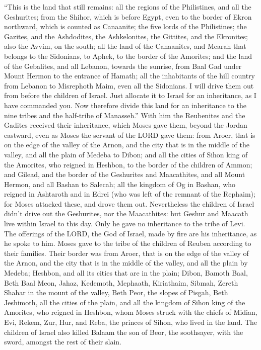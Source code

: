  ``This is the land that still remains: all the regions of
the Philistines, and all the Geshurites;  from the Shihor,
which is before Egypt, even to the border of Ekron northward, which is
counted as Canaanite; the five lords of the Philistines; the Gazites,
and the Ashdodites, the Ashkelonites, the Gittites, and the Ekronites;
also the Avvim,  on the south; all the land of the
Canaanites, and Mearah that belongs to the Sidonians, to Aphek, to the
border of the Amorites;  and the land of the Gebalites,
and all Lebanon, towards the sunrise, from Baal Gad under Mount Hermon
to the entrance of Hamath;  all the inhabitants of the
hill country from Lebanon to Misrephoth Maim, even all the Sidonians. I
will drive them out from before the children of Israel. Just allocate it
to Israel for an inheritance, as I have commanded you. 
Now therefore divide this land for an inheritance to the nine tribes and
the half-tribe of Manasseh.''  With him the Reubenites and
the Gadites received their inheritance, which Moses gave them, beyond
the Jordan eastward, even as Moses the servant of the LORD gave them:
 from Aroer, that is on the edge of the valley of the
Arnon, and the city that is in the middle of the valley, and all the
plain of Medeba to Dibon;  and all the cities of Sihon
king of the Amorites, who reigned in Heshbon, to the border of the
children of Ammon;  and Gilead, and the border of the
Geshurites and Maacathites, and all Mount Hermon, and all Bashan to
Salecah;  all the kingdom of Og in Bashan, who reigned in
Ashtaroth and in Edrei (who was left of the remnant of the Rephaim); for
Moses attacked these, and drove them out.  Nevertheless
the children of Israel didn't drive out the Geshurites, nor the
Maacathites: but Geshur and Maacath live within Israel to this day.
 Only he gave no inheritance to the tribe of Levi. The
offerings of the LORD, the God of Israel, made by fire are his
inheritance, as he spoke to him.  Moses gave to the tribe
of the children of Reuben according to their families. 
Their border was from Aroer, that is on the edge of the valley of the
Arnon, and the city that is in the middle of the valley, and all the
plain by Medeba;  Heshbon, and all its cities that are in
the plain; Dibon, Bamoth Baal, Beth Baal Meon,  Jahaz,
Kedemoth, Mephaath,  Kiriathaim, Sibmah, Zereth Shahar in
the mount of the valley,  Beth Peor, the slopes of
Pisgah, Beth Jeshimoth,  all the cities of the plain, and
all the kingdom of Sihon king of the Amorites, who reigned in Heshbon,
whom Moses struck with the chiefs of Midian, Evi, Rekem, Zur, Hur, and
Reba, the princes of Sihon, who lived in the land.  The
children of Israel also killed Balaam the son of Beor, the soothsayer,
with the sword, amongst the rest of their slain.

